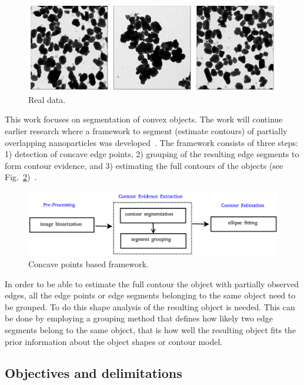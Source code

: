 \documentclass{lutmscthesis}[2010/09/22]
\begin{document}
\begin{figure}[ht]
  \includegraphics[width=\linewidth]{real_data.png}
  \caption{Real data.}
  \label{fig:real_data}
\end{figure}
This work focuses on segmentation of convex objects. The work will continue earlier research where a framework to segment (estimate contours) of partially overlapping nanoparticles was developed~\cite{zafari2017comparison}. The framework consists of three steps: 
1) detection of concave edge points, 
2) grouping of the resulting edge segments to form contour evidence, and 3) estimating the full contours of the objects (see Fig.~\ref{fig:concave_framework})~\cite{Zafari15,zafari-bb}.

\begin{figure}[ht]
  \includegraphics[width=\linewidth]{concave-framework.png}
  \caption{Concave points based framework.~\cite{zafari-bb}}
  \label{fig:concave_framework}
\end{figure}

In order to be able to estimate the full contour the object with partially observed edges, all the edge points or edge segments belonging to the same object need to be grouped. To do this shape analysis of the resulting object is needed. This can be done by employing a grouping method that defines how likely two edge segments belong to the same object, that is how well the resulting object fits the prior information about the object shapes or contour model. 


\subsection{Objectives and delimitations}
\label{sec:objectives}
\end{document}

